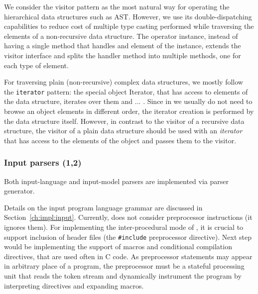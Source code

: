 We consider the visitor pattern as the most natural way for operating the hierarchical data structures such as AST.
However, we use its double-dispatching capabilities to reduce cost of multiple type casting performed while traversing the elements of a non-recursive data structure.
The operator instance, instead of having a single method that handles and element of the instance, extends the visitor interface and splits the handler method into multiple methods, one for each type of element.

For traversing plain (non-recursive) complex data structures, we mostly follow the \texttt{iterator} pattern: the special object Iterator, that has access to elements of the data structure, iterates over them and ...
. Since in \porthos[] we usually do not need to browse an object elements in different order, the iterator creation is performed by the data structure itself.
However, in contrast to the visitor of a recursive data structure, the visitor of a plain data structure should be used with an \textit{iterator} that has access to the elements of the object and passes them to the visitor.



\subsubsection{Input parsers (1,2)}
\label{ch:impl:proc:input-parser}

Both input-language and input-model parsers are implemented via  parser generator.

Details on the input program language grammar are discussed in Section~\ref{ch:impl:input}.
Currently, \porthos[2] does not consider preprocessor instructions (it ignores them).
For implementing the inter-procedural mode of \porthos{}, it is crucial to support inclusion of header files (the \texttt{\#include} preprocessor directive).
Next step would be implementing the support of macros and conditional compilation directives, that are used often in C code.
As preprocessor statements may appear in arbitrary place of a program, the preprocessor must be a stateful processing unit that reads the token stream and dynamically instrument the program by interpreting directives and expanding macros.

